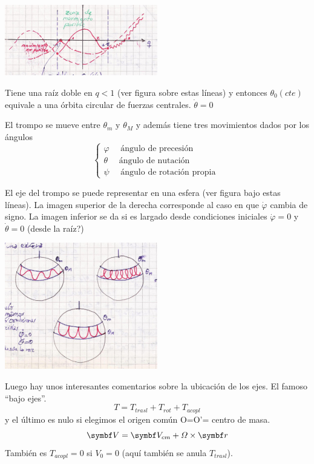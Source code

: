 \documentclass[10pt,oneside]{CBFT_book}
\begin{document}
\includegraphics[width=0.5\textwidth]{images/fig_mc_peonza_segunda_6.jpg}

Tiene una raíz doble en $q<1$ (ver figura sobre estas líneas) y entonces $\theta_0 (cte)$ equivale a una
órbita circular de fuerzas centrales. $\dot{\theta}=0$

El trompo se mueve entre $\theta_m$ y $\theta_M$ y además tiene tres movimientos dados por los ángulos
\[
	\begin{cases}
	\varphi \quad \text{ ángulo de precesión }\\
	\theta \quad \text{ ángulo de nutación } \\
	\psi \quad \text{ ángulo de rotación propia } 
	\end{cases}
\]

El eje del trompo se puede representar en una esfera (ver figura bajo estas líneas).
La imagen superior de la derecha corresponde al caso en que $\dot{\varphi}$ cambia de signo.
La imagen inferior se da si es largado desde condiciones iniciales $\dot{\varphi}=0$ y 
$\dot{\theta}=0$ (desde la raíz?)

\includegraphics[width=0.5\textwidth]{images/fig_mc_peonza_segunda_7.jpg}

Luego hay unos interesantes comentarios sobre la ubicación de los ejes. El famoso ``bajo ejes''.
\[
	T = T_{trasl} + T_{rot} + T_{acopl}
\]
y el último es nulo si elegimos el origen común O=O'= centro de masa.
\[
	\vb{V} = \vb{V}_{cm} + \Omega \times \vb{r}
\]
También es $T_{acopl}=0$ si $V_0=0$ (aquí también se anula $T_{trasl}$).

\end{document}
